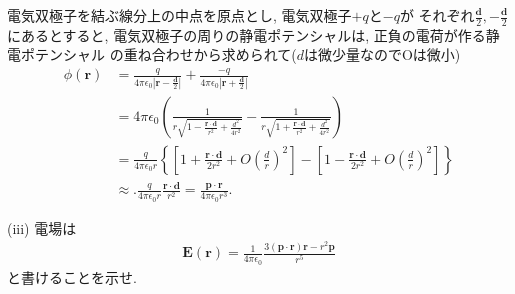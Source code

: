 \documentclass[a4paper,12pt]{jlreq}
\begin{document}
\par

電気双極子を結ぶ線分上の中点を原点とし, 電気双極子$+q$と$-q$が
それぞれ$\frac{\bm{d}}{2}, -\frac{\bm{d}}{2}$にあるとすると, 
電気双極子の周りの静電ポテンシャルは, 正負の電荷が作る静電ポテンシャル
の重ね合わせから求められて($d$は微少量なのでOは微小)
\begin{align}
  \phi(\bm{r}) &= \frac{q}{4\pi \epsilon_0 \left|\bm{r} - \frac{\bm{d}}{2}\right|} + \frac{-q}{4\pi \epsilon_0 \left|\bm{r} + \frac{\bm{d}}{2}\right|}\\
  &= 4\pi \epsilon_0 \left(\frac{1}{r\sqrt{1 - \frac{\bm{r \cdot d}}{r^2} + \frac{d^2}{4r^2}}} - \frac{1}{r\sqrt{1 + \frac{\bm{r \cdot d}}{r^2} + \frac{d^2}{4r^2}}}\right)\\
  &= \frac{q}{4\pi \epsilon_0 r} \left\{\left[ 1 + \frac{\bm{r \cdot d}}{2r^2} + O\left(\frac{d}{r}\right)^2\right] - \left[ 1 - \frac{\bm{r \cdot d}}{2r^2} + O\left(\frac{d}{r}\right)^2\right]\right\} \\
  &\approx.  \frac{q}{4\pi \epsilon_0 r} \frac{\bm{r \cdot d}}{r^2} = \frac{\bm{p \cdot r}}{4\pi \epsilon_0 r^3}.
\end{align}




\begin{itembox}[l]{(iii)}
  電場は
  \begin{align}
    \bm{E}(\bm{r}) = \frac{1}{4\pi \epsilon_0} \frac{3(\bm{p \cdot r})\bm{r} - r^2 \bm{p}}{r^5}
  \end{align}
  と書けることを示せ. 
\end{itembox}
\par
\end{document}
